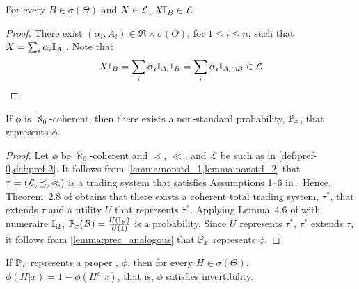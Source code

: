 \begin{lemma}
 \label{lemma:nonstd_1}
 For every $B \in \sigma(\Theta)$ and
 $X \in \sL$, $X \I_{B} \in \sL$
\end{lemma}

\begin{proof}
 There exist $(\alpha_i,A_i) \in \Re \times \sigma(\Theta)$,
 for $1 \leq i \leq n$, such that $X = \sum_{i} \alpha_i \I_{A_i}$.
 Note that
 \begin{align*}
  X \I_B 
  = \sum_{i} \alpha_i \I_{A_i} \I_B
  = \sum_{i} \alpha_i \I_{A_i \cap B} \in \sL
 \end{align*}
\end{proof}

\begin{lemma}
 \label{lemma:coherence-nonstd_1}
 If $\phi$ is $\aleph_0$-coherent,
 then there exists a non-standard probability,
 $\P_x$, that represents $\phi$.
\end{lemma}

\begin{proof}
 Let $\phi$ be $\aleph_0$-coherent and
 $\preceq$, $\ll$, and $\mathcal{L}$ be such as in \cref{def:pref-0,def:pref-2}. It follows from \cref{lemma:nonstd_1,lemma:nonstd_2} that $\tau = (\sL,\preceq,\ll)$ is a trading system that satisfies Assumptions 1--6 in \citet{Schervish2025}. Hence, Theorem~2.8 of \citet{Schervish2025} obtains that there exists a coherent total trading system, $\tau^*$, that extends $\tau$ and a utility $U$ that represents $\tau^*$. Applying Lemma~4.6 of \citet{Schervish2025} with numeraire $\I_{\Omega}$, $\P_x(B) = \frac{U(\I_B)}{U(1)}$ is a probability. Since $U$ represents $\tau^*$, $\tau^*$ extends $\tau$, it follows from \cref{lemma:prec_analogous} that $\P_x$ represents $\phi$.
\end{proof}

\begin{lemma}
 \label{lemma:coherence-nonstd_2_1}
 If $\P_x$ represents a proper \summ, $\phi$,
 then for every $H \in \sigma(\Theta)$,
 $\phi(H|x) = 1 - \phi(H^c|x)$,
 that is, $\phi$ satisfies invertibility.
\end{lemma}

